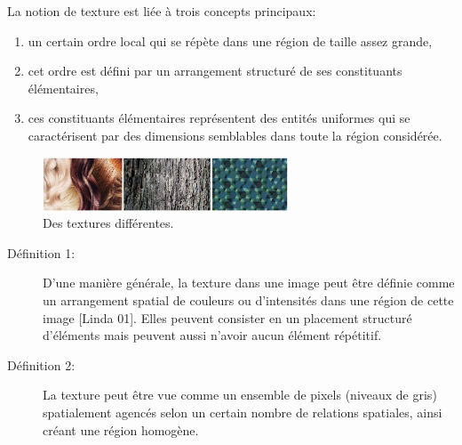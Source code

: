 La notion de texture est liée à trois concepts principaux:
\begin{enumerate}
	\item un certain ordre local qui se répète dans une région de taille assez grande,
	
	\item cet ordre est défini par un arrangement structuré de ses constituants élémentaires,
	
	\item ces constituants élémentaires représentent des entités uniformes qui se caractérisent par des dimensions semblables dans toute la région considérée.\\ 
	
\end{enumerate}

\begin{figure}[H]
	\label{fig:textures}
	\centering
	\includegraphics[width=0.65\textwidth]{Figures/textures} %
	\caption{Des textures différentes.}
	
\end{figure}

\begin{description}
	\item[Définition 1:] 	
	D'une manière générale, la texture dans une image peut être définie comme un arrangement spatial de couleurs ou d'intensités dans une région de cette image [Linda 01]. Elles peuvent consister en un placement structuré d’éléments mais peuvent aussi n’avoir aucun élément répétitif.
\end{description}

\begin{description}
	\item[Définition 2:] 	
	La texture peut être vue comme un ensemble de pixels (niveaux de gris) spatialement agencés selon un certain nombre de relations spatiales, ainsi créant une région homogène.
\end{description}

